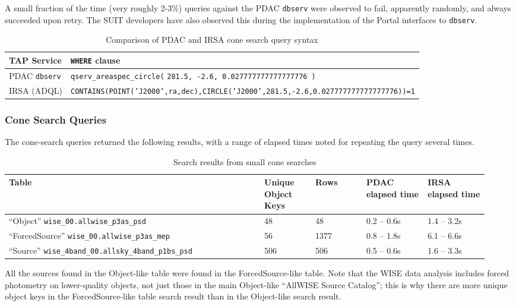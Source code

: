 \documentclass[DM,lsstdraft,STR,toc]{lsstdoc}
\begin{document}
A small fraction of the time (very roughly 2-3\%) queries against the PDAC \verb|dbserv| were observed to fail,
apparently randomly, and always succeeded upon retry.
The SUIT developers have also observed this during the implementation of the Portal interfaces to \verb|dbserv|.

\begin{table}[h]
\centering
\begin{tabular}{l l}
TAP Service & \texttt{WHERE} clause \\ \hline
PDAC \texttt{dbserv} & \verb|qserv_areaspec_circle(| \texttt{281.5, -2.6, 0.027777777777777776 )} \\
IRSA (ADQL) & \texttt{CONTAINS(POINT('J2000',ra,dec),CIRCLE('J2000',281.5,-2.6,0.027777777777777776))=1} \\
\end{tabular}
\caption{Comparison of PDAC and IRSA cone search query syntax}
\label{tab:conesyntax}
\end{table}

\subsubsection{Cone Search Queries}

The cone-search queries returned the following results, with a range of elapsed times noted for repeating the query several times.

\begin{table}[h]
\centering
\begin{tabular}{p{0.5 \linewidth} p{0.1 \linewidth} p{0.1 \linewidth} p{0.12 \linewidth} p{0.12 \linewidth}}
Table & Unique Object Keys & Rows & PDAC elapsed time & IRSA elapsed time \\ \hline
``Object'' \verb|wise_00.allwise_p3as_psd| & 48 & 48 & 0.2 -- 0.6s & 1.4 -- 3.2s \\
``ForcedSource'' \verb|wise_00.allwise_p3as_mep| & 56 & 1377 & 0.8 -- 1.8s & 6.1 -- 6.6s \\
``Source'' \verb|wise_4band_00.allsky_4band_p1bs_psd| & 506 & 506 & 0.5 -- 0.6s & 1.6 -- 3.3s \\
\end{tabular}
\caption{Search results from small cone searches}
\label{tab:conesyntax}
\end{table}

All the sources found in the Object-like table were found in the ForcedSource-like table.
Note that the WISE data analysis includes forced photometry on lower-quality objects,
not just those in the main Object-like ``AllWISE Source Catalog'';
this is why there are more unique object keys in the ForcedSource-like table search result than in the Object-like search result.
\end{document}
